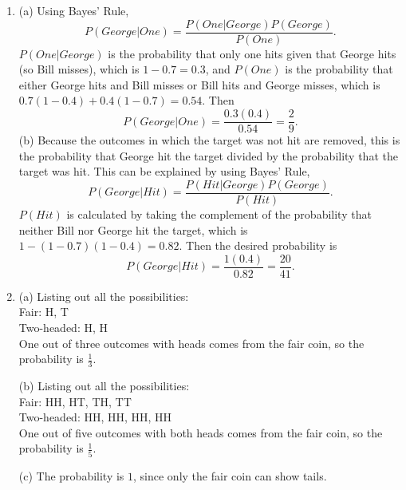 \documentclass[a4paper,12pt]{article}
\begin{document}
\begin{enumerate}
\item (a) Using Bayes' Rule,
\[ P(George|One) = \frac{P(One|George)P(George)}{P(One)}. \]
$P(One|George)$ is the probability that only one hits given that George hits (so Bill misses), which is $1 - 0.7 = 0.3$, and $P(One)$ is the probability that either George hits and Bill misses or Bill hits and George misses, which is $0.7(1 - 0.4) + 0.4(1 - 0.7) = 0.54$. Then
\[ P(George|One) = \frac{0.3(0.4)}{0.54} = \frac{2}{9}. \]
(b) Because the outcomes in which the target was not hit are removed, this is the probability that George hit the target divided by the probability that the target was hit. This can be explained by using Bayes' Rule,
\[ P(George|Hit) = \frac{P(Hit|George)P(George)}{P(Hit)}. \]
$P(Hit)$ is calculated by taking the complement of the probability that neither Bill nor George hit the target, which is $1 - (1 - 0.7)(1 - 0.4) = 0.82$. Then the desired probability is
\[ P(George|Hit) = \frac{1(0.4)}{0.82} = \frac{20}{41}. \]

\item (a) Listing out all the possibilities: \\
Fair: H, T \\
Two-headed: H, H \\
One out of three outcomes with heads comes from the fair coin, so the probability is $\frac{1}{3}$. \par
(b) Listing out all the possibilities: \\
Fair: HH, HT, TH, TT \\
Two-headed: HH, HH, HH, HH \\
One out of five outcomes with both heads comes from the fair coin, so the probability is $\frac{1}{5}$. \par
(c) The probability is $1$, since only the fair coin can show tails.

\end{enumerate}
\end{document}
